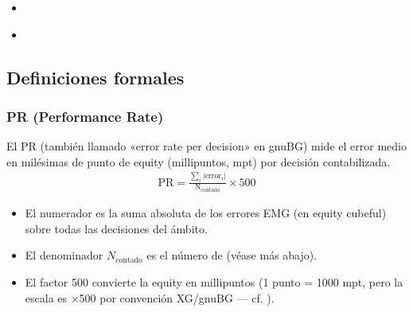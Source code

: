 \documentclass[letterpaper,10pt,spanish]{sphinxmanual}
\begin{document}
\begin{sphinxcontents}
\begin{itemize}
\begin{itemize}
\item {} 
\sphinxAtStartPar
{}\label{\detokenize{stats_parity:id11}}{\hyperref[\detokenize{stats_parity:comparaison-gnubg-blunderdb-import-sgf-moteurs-differents}]{}}

\end{itemize}

\item {} 
\sphinxAtStartPar
{}\label{\detokenize{stats_parity:id12}}{\hyperref[\detokenize{stats_parity:valider-vos-propres-chiffres}]{}}

\item {} 
\sphinxAtStartPar
{}\label{\detokenize{stats_parity:id13}}{\hyperref[\detokenize{stats_parity:reference-gnubg}]{}}

\end{itemize}
\end{sphinxcontents}


\subsection{Definiciones formales}
\label{\detokenize{stats_parity:definitions-formelles}}

\subsubsection{PR (Performance Rate)}
\label{\detokenize{stats_parity:pr-performance-rate}}
\sphinxAtStartPar
El PR (también llamado «error rate per decision» en gnuBG) mide el error medio en milésimas de punto de equity (millipuntos, mpt) por decisión contabilizada.
\begin{equation*}
\begin{split}\mathrm{PR} = \frac{\sum_i |\mathrm{error}_i|}{\mathrm{N_{contado}}} \times 500\end{split}
\end{equation*}\begin{itemize}
\item {} 
\sphinxAtStartPar
El numerador es la suma absoluta de los errores EMG (en equity cubeful) sobre todas las decisiones del ámbito.

\item {} 
\sphinxAtStartPar
El denominador \(N_\text{contado}\) es el número de  (véase más abajo).

\item {} 
\sphinxAtStartPar
El factor 500 convierte la equity en millipuntos (1 punto = 1000 mpt, pero la escala es ×500 por convención XG/gnuBG — cf. ).

\end{itemize}
\end{document}
